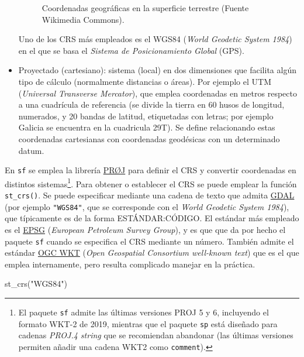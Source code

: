 \documentclass[
  spanish,
]{book}
\newenvironment{Shaded}{\begin{snugshade}}{\end{snugshade}}
\newcommand{\FunctionTok}[1]{\textcolor[rgb]{0.00,0.00,0.00}{#1}}
\newcommand{\NormalTok}[1]{#1}
\newcommand{\StringTok}[1]{\textcolor[rgb]{0.31,0.60,0.02}{#1}}
\theoremstyle{break}
\begin{document}
\begin{itemize}
\begin{figure}[!htb]
{    }

    \caption{Coordenadas geográficas en la superficie terrestre (Fuente Wikimedia Commons).}\label{fig:latlon}
    \end{figure}

  Uno de los CRS más empleados es el WGS84 (\emph{World Geodetic System 1984}) en el que se basa el \emph{Sistema de Posicionamiento Global} (GPS).
\item
  Proyectado (cartesiano): sistema (local) en dos dimensiones que facilita algún tipo de cálculo (normalmente distancias o áreas). Por ejemplo el UTM (\emph{Universal Transverse Mercator}), que emplea coordenadas en metros respecto a una cuadrícula de referencia (se divide la tierra en 60 husos de longitud, numerados, y 20 bandas de latitud, etiquetadas con letras; por ejemplo Galicia se encuentra en la cuadricula 29T). Se define relacionando estas coordenadas cartesianas con coordenadas geodésicas con un determinado datum.
\end{itemize}

En \texttt{sf} se emplea la librería \href{http://proj.org/}{PRØJ} para definir el CRS y convertir coordenadas en distintos sistemas\footnote{El paquete \texttt{sf} admite las últimas versiones PROJ 5 y 6, incluyendo el formato WKT-2 de 2019, mientras que el paquete \texttt{sp} está diseñado para cadenas \emph{PROJ.4 string} que se recomiendan abandonar (las últimas versiones permiten añadir una cadena WKT2 como \texttt{comment}).}.
Para obtener o establecer el CRS se puede emplear la función \texttt{st\_crs()}.
Se puede especificar mediante una cadena de texto que admita \href{https://gdal.org/tutorials/osr_api_tut.html}{GDAL} (por ejemplo \texttt{"WGS84"}, que se corresponde con el \emph{World Geodetic System 1984}), que típicamente es de la forma ESTÁNDAR:CÓDIGO.
El estándar más empleado es el \href{https://epsg.org}{EPSG} (\emph{European Petroleum Survey Group}), y es que que da por hecho el paquete \texttt{sf} cuando se especifica el CRS mediante un número.
También admite el estándar \href{http://www.opengeospatial.org/standards/wkt-crs}{OGC WKT} (\emph{Open Geospatial Consortium well-known text}) que es el que emplea internamente, pero resulta complicado manejar en la práctica.

\begin{Shaded}
\begin{Highlighting}[]
\FunctionTok{st\_crs}\NormalTok{(}\StringTok{"WGS84"}\NormalTok{)}
\end{Highlighting}
\end{Shaded}
\end{document}
